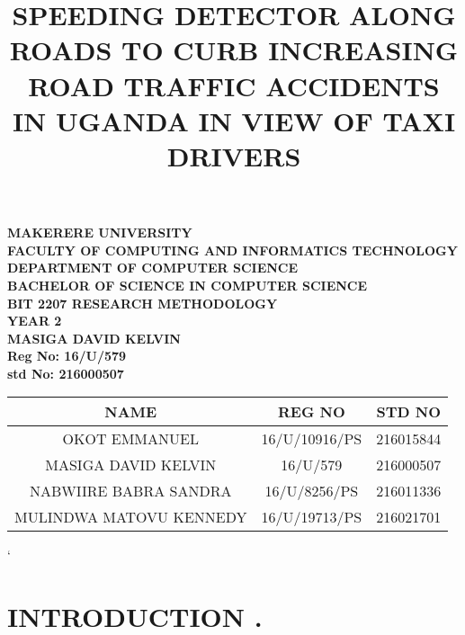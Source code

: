 \documentclass[a4paper,12pt]{article}
\begin{document}
\begin{Huge}
\begin{center}
\begin{normalsize}

\textbf{MAKERERE UNIVERSITY } \\
\textbf{FACULTY OF COMPUTING AND INFORMATICS TECHNOLOGY} \\
\textbf{DEPARTMENT OF COMPUTER SCIENCE} \\
\textbf{BACHELOR OF SCIENCE IN COMPUTER SCIENCE} \\
\textbf{BIT 2207 RESEARCH METHODOLOGY} \\
\textbf{YEAR 2} \\


\textbf{\sc MASIGA DAVID KELVIN } \\
\textbf{\sc Reg No: 16/U/579 } \\
\textbf{\sc std No: 216000507}\\
\end{normalsize}
\end{center}
\end{Huge}
\begin{center}
\begin{tabular}{|c|c|c|}
\hline
NAME & REG NO & STD NO \\ [0.5ex]
\hline
OKOT EMMANUEL & 16/U/10916/PS &216015844 \\ [0.5ex]
\hline
MASIGA DAVID KELVIN & 16/U/579& 216000507 \\ [0.5ex]
\hline
NABWIIRE BABRA SANDRA & 16/U/8256/PS & 216011336\\ [0.5ex]
\hline
MULINDWA MATOVU KENNEDY& 16/U/19713/PS & 216021701\\ [0.5ex]

\hline
\end{tabular}
\end{center}`

\newpage
\title{ SPEEDING DETECTOR ALONG ROADS TO CURB
INCREASING ROAD TRAFFIC ACCIDENTS IN UGANDA IN VIEW OF TAXI DRIVERS
}
\maketitle
\section{\sc INTRODUCTION .}
\end{document}
